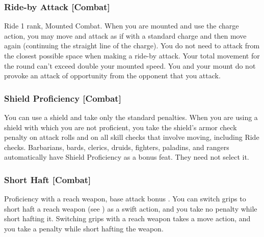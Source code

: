 
\subsubsection{Ride-by Attack [Combat]}
 Ride 1 rank, Mounted Combat.
 When you are mounted and use the charge action, you may move and attack as if with a standard charge and then move again (continuing the straight line of the charge). You do not need to attack from the closest possible space when making a ride-by attack. Your total movement for the round can't exceed double your mounted speed. You and your mount do not provoke an attack of opportunity from the opponent that you attack.%

\subsubsection{Shield Proficiency [Combat]}
 You can use a shield and take only the standard penalties.
 When you are using a shield with which you are not proficient, you take the shield's armor check penalty on attack rolls and on all skill checks that involve moving, including Ride checks.
 Barbarians, bards, clerics, druids, fighters, paladins, and rangers automatically have Shield Proficiency as a bonus feat. They need not select it.

\subsubsection{Short Haft [Combat]}
 Proficiency with a reach weapon, base attack bonus .
 You can switch grips to short haft a reach weapon (see ) as a swift action, and you take no penalty while short hafting it.
 Switching grips with a reach weapon takes a move action, and you take a  penalty while short hafting the weapon.

